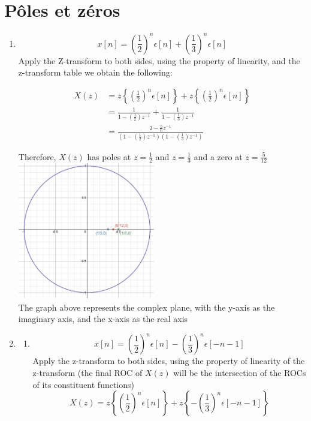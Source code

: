 \documentclass{article}
\begin{document}
\section{Pôles et zéros}
\begin{enumerate}
\item
$$
x[n]=\left( \frac{1}{2} \right)^n \epsilon[n] + \left( \frac{1}{3} \right)^n \epsilon[n]
$$
Apply the Z-transform to both sides, using the property of linearity, and the z-transform table we obtain the following:

\begin{align}
  X(z) &= z\left\{ \left(\frac{1}{2}\right)^n \epsilon[n] \right\} + z\left\{ \left(\frac{1}{2}\right)^n \epsilon[n] \right\}  \nonumber\\
          &= \frac{1}{1-\left(\frac{1}{2}\right)z^{-1}} + \frac{1}{1-\left(\frac{1}{3}\right)z^{-1}} \nonumber\\
          &= \frac{2 -\frac{5}{6}z^{-1}}{\left(1 -\left(\frac{1}{2}\right) z^{-1}\right) \left(1 -\left(\frac{1}{3}\right) z^{-1} \right)}
\end{align}

Therefore, $X(z)$ has poles at $z=\frac{1}{2}$ and $z=\frac{1}{3}$ and a zero at $z=\frac{5}{12}$ \\

\includegraphics[width=170pt,height=170pt]{ee350_hw2_1_1} \\
The graph above represents the complex plane, with the y-axis as the imaginary axis, and the x-axis as the real axis

\item
\begin{enumerate}
\item
$$
x[n] =\left( \frac{1}{2}\right)^n\epsilon[n] - \left( \frac{1}{3}\right)^n\epsilon[-n-1]
$$
        Apply the z-transform to both sides, using the property of linearity of the z-transform (the final ROC of $X(z)$ will be the intersection of the ROCs of its constituent functions)
$$
   X(z) = z\left\{ \left(\frac{1}{2}\right)^n \epsilon[n] \right\} + z\left\{-\left(\frac{1}{3}\right)^n  \epsilon[-n-1] \right\}
$$


\end{enumerate}
\end{enumerate}
\end{document}
